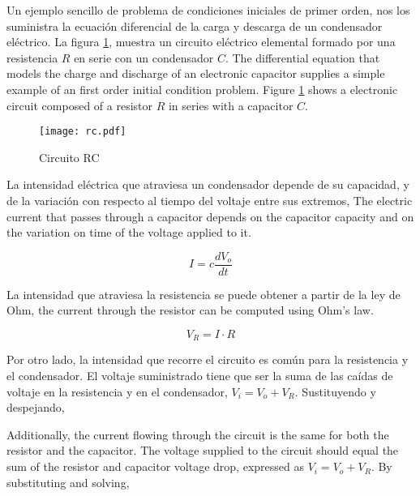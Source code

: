 \begin{paracol}{2}
Un ejemplo sencillo de problema de condiciones iniciales de primer orden, nos los suministra la ecuación diferencial de la carga y descarga de un condensador eléctrico. La figura \ref{fig:RC}, muestra un circuito eléctrico elemental formado por una resistencia $R$ en serie con un condensador $C$. 
\switchcolumn
The differential equation that models the charge and discharge of an electronic capacitor supplies a simple example of an first order initial condition problem. Figure \ref{fig:RC} shows a electronic circuit composed of a resistor $R$ in series with a capacitor $C$. 
   
\end{paracol}
\begin{figure}[h]
\centering
\texttt{[image: rc.pdf]}
\caption{Circuito RC}
\label{fig:RC}
\end{figure}
\begin{paracol}{2}
La intensidad eléctrica que atraviesa un condensador depende de su capacidad, y de la variación con respecto al tiempo del voltaje entre sus extremos,
\switchcolumn	
The electric current that passes through a capacitor depends on the capacitor capacity and on the variation on time of the voltage applied to it.
 
\end{paracol}
\begin{equation*}
I=c\frac{dV_o}{dt}
\end{equation*}
\begin{paracol}{2}
La intensidad que atraviesa la resistencia se puede obtener a partir de la ley de Ohm,
\switchcolumn
the current through the resistor can be computed using Ohm's law.
\end{paracol}
\begin{equation*}
V_R=I\cdot R
\end{equation*}
\begin{paracol}{2}
Por otro lado, la intensidad que recorre el circuito es común para la resistencia y el condensador. El voltaje suministrado tiene que ser la suma de las caídas de voltaje en la resistencia y en el condensador, $V_i=V_o+V_R$. Sustituyendo y despejando,

\switchcolumn
Additionally, the current flowing through the circuit is the same for both the resistor and the capacitor. The voltage supplied to the circuit should equal the sum of the resistor and capacitor voltage drop, expressed as $V_i = V_o + V_R$. By substituting and solving,
\end{paracol}
